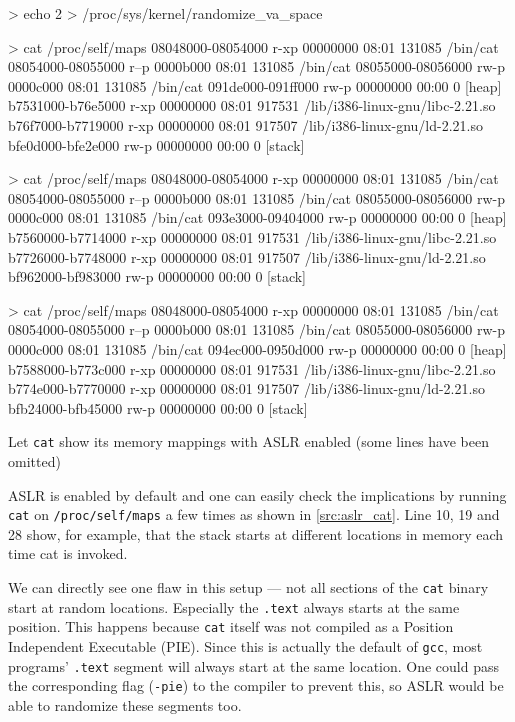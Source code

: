 \documentclass[article]{uibk}
\begin{document}
\begin{listing}[h!]
    \begin{code}
        > echo 2 > /proc/sys/kernel/randomize_va_space

        > cat /proc/self/maps
        08048000-08054000 r-xp 00000000 08:01 131085     /bin/cat
        08054000-08055000 r--p 0000b000 08:01 131085     /bin/cat
        08055000-08056000 rw-p 0000c000 08:01 131085     /bin/cat
        091de000-091ff000 rw-p 00000000 00:00 0          [heap]
        b7531000-b76e5000 r-xp 00000000 08:01 917531     /lib/i386-linux-gnu/libc-2.21.so
        b76f7000-b7719000 r-xp 00000000 08:01 917507     /lib/i386-linux-gnu/ld-2.21.so
        bfe0d000-bfe2e000 rw-p 00000000 00:00 0          [stack]

        > cat /proc/self/maps
        08048000-08054000 r-xp 00000000 08:01 131085     /bin/cat
        08054000-08055000 r--p 0000b000 08:01 131085     /bin/cat
        08055000-08056000 rw-p 0000c000 08:01 131085     /bin/cat
        093e3000-09404000 rw-p 00000000 00:00 0          [heap]
        b7560000-b7714000 r-xp 00000000 08:01 917531     /lib/i386-linux-gnu/libc-2.21.so
        b7726000-b7748000 r-xp 00000000 08:01 917507     /lib/i386-linux-gnu/ld-2.21.so
        bf962000-bf983000 rw-p 00000000 00:00 0          [stack]

        > cat /proc/self/maps
        08048000-08054000 r-xp 00000000 08:01 131085     /bin/cat
        08054000-08055000 r--p 0000b000 08:01 131085     /bin/cat
        08055000-08056000 rw-p 0000c000 08:01 131085     /bin/cat
        094ec000-0950d000 rw-p 00000000 00:00 0          [heap]
        b7588000-b773c000 r-xp 00000000 08:01 917531     /lib/i386-linux-gnu/libc-2.21.so
        b774e000-b7770000 r-xp 00000000 08:01 917507     /lib/i386-linux-gnu/ld-2.21.so
        bfb24000-bfb45000 rw-p 00000000 00:00 0          [stack]
    \end{code}
    \caption{Let \texttt{cat} show its memory mappings with ASLR enabled (some
lines have been omitted)}
    \label{src:aslr_cat}
\end{listing}

ASLR is enabled by default and one can easily check the implications by running
\texttt{cat} on \texttt{/proc/self/maps} a few times as shown in
\cref{src:aslr_cat}. Line 10, 19 and 28 show, for example, that the stack
starts at different locations in memory each time cat is invoked.

We can directly see one flaw in this setup --- not all sections of the
\texttt{cat} binary start at random locations. Especially the \texttt{.text}
always starts at the same position. This happens because \texttt{cat} itself
was not compiled as a Position Independent Executable (PIE). Since this is
actually the default of \texttt{gcc}, most programs' \texttt{.text} segment
will always start at the same location. One could pass the corresponding flag
(\texttt{-pie}) to the compiler to prevent this, so ASLR would be able to
randomize these segments too.
\end{document}
